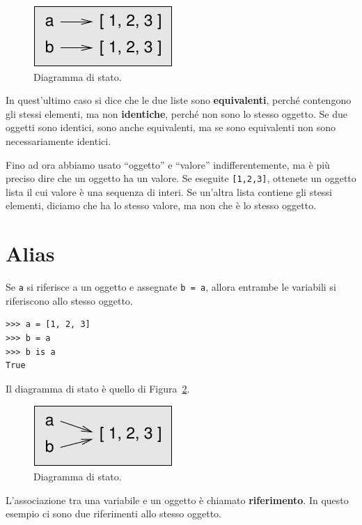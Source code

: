 \documentclass[10pt]{book}
\begin{document}
\begin{figure}
\centerline
{\includegraphics[scale=0.8]{figs/list2.pdf}}
\caption{Diagramma di stato.}
\label{fig.list2}
\end{figure}


In quest'ultimo caso si dice che le due liste sono {\bf equivalenti},
perché contengono gli stessi elementi, ma non {\bf identiche}, perché non sono lo stesso oggetto.
Se due oggetti sono identici, sono anche equivalenti, ma se sono equivalenti non sono necessariamente identici.

Fino ad ora abbiamo usato ``oggetto'' e ``valore'' indifferentemente, ma è più preciso dire che un oggetto ha un valore.  Se eseguite {\tt [1,2,3]}, ottenete un oggetto lista il cui valore è una sequenza di interi. Se un'altra lista contiene gli stessi elementi, diciamo che ha lo stesso valore, ma non che è lo stesso oggetto.


\section{Alias}

Se {\tt a} si riferisce a un oggetto e assegnate {\tt b = a},
allora entrambe le variabili si riferiscono allo stesso oggetto.

\begin{verbatim}
>>> a = [1, 2, 3]
>>> b = a
>>> b is a
True
\end{verbatim}
%
Il diagramma di stato è quello di Figura~\ref{fig.list3}.

\begin{figure}
\centerline
{\includegraphics[scale=0.8]{figs/list3.pdf}}
\caption{Diagramma di stato.}
\label{fig.list3}
\end{figure}

L'associazione tra una variabile e un oggetto è chiamato {\bf
riferimento}. In questo esempio ci sono due riferimenti allo stesso oggetto.
\end{document}
